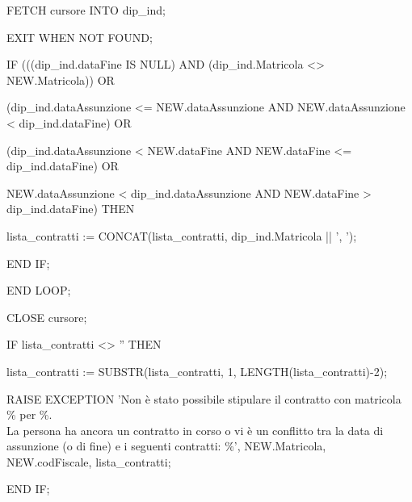 \begin{flushleft}
\begin{description}
\begin{description}
                            \vspace{0.5cm}

                            \begin{description}
                                \item FETCH cursore INTO dip\_ind;
                                \item EXIT WHEN NOT FOUND;
                                \item IF (((dip\_ind.dataFine IS NULL) AND (dip\_ind.Matricola <> NEW.Matricola)) OR\\
                                \item (dip\_ind.dataAssunzione <= NEW.dataAssunzione AND NEW.dataAssunzione < dip\_ind.dataFine) OR\\
                                \item (dip\_ind.dataAssunzione < NEW.dataFine AND NEW.dataFine <= dip\_ind.dataFine) OR\\
                                \item NEW.dataAssunzione < dip\_ind.dataAssunzione AND NEW.dataFine > dip\_ind.dataFine) THEN
                                \begin{description}
                                    \item lista\_contratti := CONCAT(lista\_contratti, dip\_ind.Matricola || ', ');
                                \end{description}
                                \item END IF;
                            \end{description}

                            \item END LOOP;
                            \item CLOSE cursore;
                            \vspace{0.5cm}
                            \item IF lista\_contratti <> '' THEN
                                \begin{description}
                                    \item lista\_contratti := SUBSTR(lista\_contratti, 1, LENGTH(lista\_contratti)-2);
                                    \item RAISE EXCEPTION 'Non è stato possibile stipulare il contratto con matricola \% per \%. \\La persona ha ancora un contratto in corso o vi è un conflitto tra la data di assunzione (o di fine) e i seguenti contratti: \%', NEW.Matricola, NEW.codFiscale, lista\_contratti;
                                \end{description}
                            \item END IF;
                            \vspace{0.5cm}


\end{description}
\end{description}
\end{flushleft}
